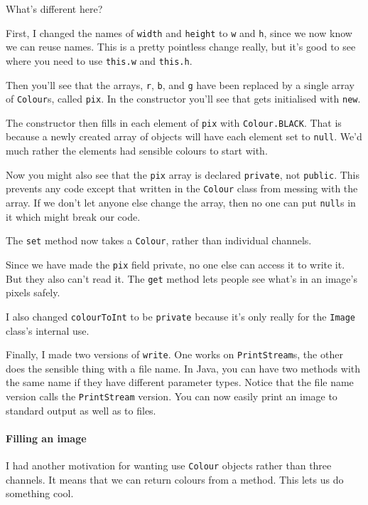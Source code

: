 \documentclass{article}
\begin{document}
            What's different here? 
            
            First, I changed the names of \texttt{width} and \texttt{height} to \texttt{w} and \texttt{h}, since we now know we can reuse
            names. This is a pretty pointless change really, but it's good to see where you need to use \texttt{this.w} and \texttt{this.h}.
            
            Then you'll see that the arrays, \texttt{r}, \texttt{b}, and \texttt{g} have been replaced by a single array of
            \texttt{Colour}s, called \texttt{pix}. In the constructor you'll see that gets initialised with \texttt{new}.

            The constructor then fills in each element of \texttt{pix} with \texttt{Colour.BLACK}. That is because a newly created array of
            objects will have each element set to \texttt{null}. We'd much rather the elements had sensible colours to start with.
            
            Now you might also see that the \texttt{pix} array is declared \texttt{private}, not \texttt{public}. This prevents any code
            except that written in the \texttt{Colour} class from messing with the array. If we don't let anyone else change the array,
            then no one can put \texttt{null}s in it which might break our code.
            
            The \texttt{set} method now takes a \texttt{Colour}, rather than individual channels.
            
            Since we have made the \texttt{pix} field private, no one else can access it to write it. But they also can't read it. The
            \texttt{get} method lets people see what's in an image's pixels safely. 
            
            I also changed \texttt{colourToInt} to be \texttt{private} because it's only really for the \texttt{Image} class's internal use.
            
            Finally, I made two versions of \texttt{write}. One works on \texttt{PrintStream}s, the other does the sensible thing with a
            file name. In Java, you can have two methods with the same name if they have different parameter types. Notice that the file
            name version calls the \texttt{PrintStream} version. You can now easily print an image to standard output as well as to files.
            
        \paragraph{Filling an image}
            I had another motivation for wanting use \texttt{Colour} objects rather than three channels. It means that we can return
            colours from a method. This lets us do something cool.
            
\end{document}
